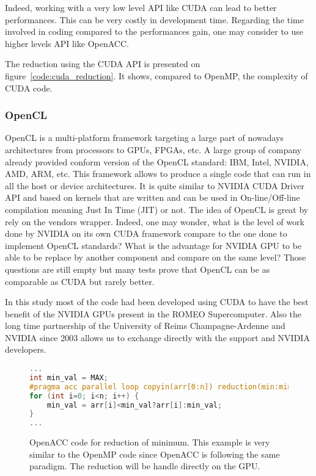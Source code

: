 Indeed, working with a very low level API like CUDA can lead to better performances. 
This can be very costly in development time. 
Regarding the time involved in coding compared to the performances gain, one may consider to use higher levels API like OpenACC. 

The reduction using the CUDA API is presented on figure~\ref{code:cuda_reduction}.
It shows, compared to OpenMP, the complexity of CUDA code. 

\subsubsection{OpenCL}
OpenCL is a multi-platform framework targeting a large part of nowadays architectures from processors to GPUs, FPGAs, etc.
A large group of company already provided conform version of the OpenCL standard: IBM, Intel, NVIDIA, AMD, ARM, etc.
This framework allows to produce a single code that can run in all the host or device architectures. 
It is quite similar to NVIDIA CUDA Driver API and based on kernels that are written and can be used in On-line/Off-line compilation meaning Just In Time (JIT) or not. 
The idea of OpenCL is great by rely on the vendors wrapper.
Indeed, one may wonder, what is the level of work done by NVIDIA on its own CUDA framework compare to the one done to implement OpenCL standards? 
What is the advantage for NVIDIA GPU to be able to be replace by another component and compare on the same level? 
Those questions are still empty but many tests prove that OpenCL can be as comparable as CUDA but rarely better\cite{karimi2010performance,fang2011comprehensive}. 

In this study most of the code had been developed using CUDA to have the best benefit of the NVIDIA GPUs present in the ROMEO Supercomputer. 
Also the long time partnership of the University of Reims Champagne-Ardenne and NVIDIA since 2003 allows us to exchange directly with the support and NVIDIA developers. 


\begin{figure}[t!]
\begin{lstlisting}[language=C]
...
int min_val = MAX; 
#pragma acc parallel loop copyin(arr[0:n]) reduction(min:min_val) 
for (int i=0; i<n; i++) { 
    min_val = arr[i]<min_val?arr[i]:min_val; 
}
...
\end{lstlisting}
\caption[OpenACC code for reduction]{OpenACC code for reduction of minimum. This example is very similar to the OpenMP code since OpenACC is following the same paradigm. The reduction will be handle directly on the GPU. }
\label{code:openacc_reduction}
\end{figure}



